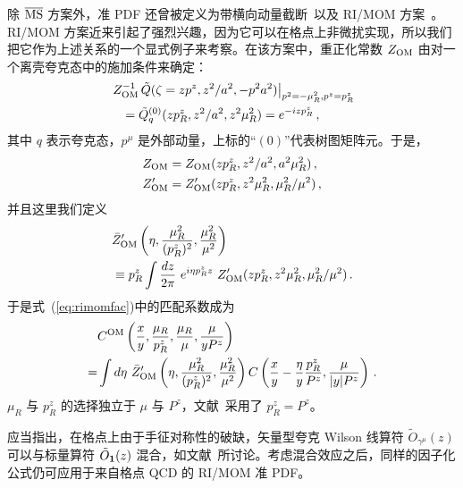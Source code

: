 除 $\overline{\rm MS}$ 方案外，准 PDF 还曾被定义为带横向动量截断~\cite{Xiong:2013bka,Lin:2014zya,Ma:2014jla,Alexandrou:2015rja}以及 RI/MOM 方案~\cite{Constantinou:2017sej,Alexandrou:2017huk,Chen:2017mzz,Green:2017xeu,Stewart:2017tvs}。RI/MOM 方案近来引起了强烈兴趣，因为它可以在格点上非微扰实现，所以我们把它作为上述关系的一个显式例子来考察。在该方案中，重正化常数 $Z_{\rm OM}$ 由对一个离壳夸克态中的\spcorr 施加条件来确定：
\begin{align}
&\left.Z^{-1}_{\rm OM}\,
\tilde{Q}(\zeta=zp^z,z^2/a^2,-p^2a^2)\right|_{p^2=-\mu_R^2,p^z=p_R^z}
\nonumber\\
& \quad = \tilde{Q}^{(0)}_q(zp_R^z,z^2/a^2,z^2\mu_R^2) = e^{-izp_R^z}\,,
\end{align}
其中 $q$ 表示夸克态，$p^\mu$ 是外部动量，上标的``$(0)$''代表树图矩阵元。于是，
\begin{align}
Z_{\rm OM} &= Z_{\rm OM} (zp_R^z, z^2/a^2,a^2\mu_R^2)\,,\nonumber\\
Z'_{\rm OM}&=Z'_{\rm OM}(zp_R^z, z^2\mu_R^2, \mu_R^2/\mu^2)\,,
\end{align}
并且这里我们定义
\begin{align}
	&\bar{Z}'_{\rm OM}\left(\eta,{\mu_R^2\over (p_R^z)^2},{\mu_R^2\over \mu^2}\right)\nonumber\\
	&\equiv
   p_R^z \int {dz\over 2\pi}\ e^{i\eta p_R^z z}\ Z'_{\rm OM}(zp_R^z, z^2\mu_R^2, \mu_R^2/\mu^2)\,.
\end{align}
于是式~(\ref{eq:rimomfac})中的匹配系数成为
\begin{align}
& C^{\rm OM}\left(\frac{x}{y}, {\mu_R\over p_R^z},{\mu_R\over \mu}, {\mu\over yP^z}\right)
 \\
=& \int d\eta\ \bar{Z}'_{\rm OM}\left(\eta,{\mu_R^2\over (p_R^z)^2},{\mu_R^2\over\mu^2}\right) C\left({x\over y}-{\eta\over y}{p_R^z\over P^z}, {\mu\over |y|P^z}\right)
 \,. \nonumber
\end{align}
$\mu_R$ 与 $p_R^z$ 的选择独立于 $\mu$ 与 $P^z$，文献~\cite{Chen:2017mzz,Stewart:2017tvs}采用了 $p_R^z=P^z$。

应当指出，在格点上由于手征对称性的破缺，矢量型夸克 Wilson 线算符 $\tilde{O}_{\gamma^\mu}(z)$ 可以与标量算符 $\tilde{O}_{\bf 1}(z)$ 混合，如文献~\cite{Constantinou:2017sej,Alexandrou:2017huk,Chen:2017mzz,Green:2017xeu,Chen:2017mie}所讨论。考虑混合效应之后，同样的因子化公式仍可应用于来自格点 QCD 的 RI/MOM 准 PDF。
